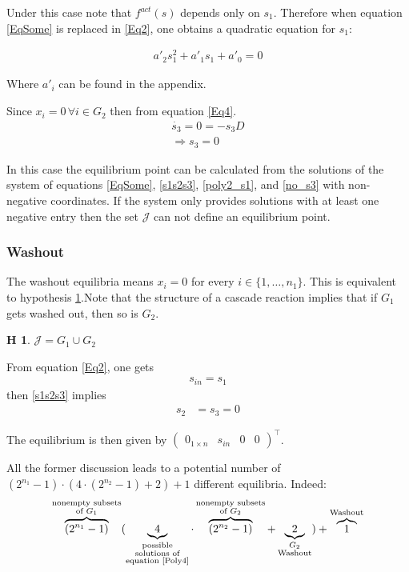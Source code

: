 \documentclass[processes,article,submit,moreauthors,pdftex]{Definitions/mdpi}
\newtheorem{hypo}{H}
\begin{document}
Under this case note that $f^{act}(s)$ depends only on $s_1$. Therefore when equation \eqref{EqSome} is replaced in \eqref{Eq2}, one obtains a quadratic equation for $s_1$:

\begin{align}
\label{poly2_s1} a'_2 s_1^2 + a'_1s_1 + a'_0 = 0
\end{align}

Where $a'_i$ can be found in the appendix.

Since $x_i = 0 \, \forall i \in G_2$ then from equation \eqref{Eq4}.
\begin{align}
\dot{s_3} = 0 = -s_3D \\
\Rightarrow s_3 = 0 \label{no_s3}
\end{align}

In this case the equilibrium point can be calculated from the solutions of the system of equations \eqref{EqSome}, \eqref{s1s2s3}, \eqref{poly2_s1}, and \eqref{no_s3} with non-negative coordinates. If the system only provides solutions with at least one negative entry then the set $\mathcal{J}$ can not define an equilibrium point.

\subsubsection{Washout}

The washout equilibria means $x_i = 0$ for every $i \in \{1,\dots, n_1\}$. This is equivalent to hypothesis \ref{hypothesis washout}.Note that the structure of a cascade reaction implies that if $G_1$ gets washed out, then so is $G_2$.

\begin{hypo} 
	$\mathcal{J} = G_1 \cup G_2$
	\label{hypothesis washout}
\end{hypo} 

From equation \eqref{Eq2}, one gets 
\begin{align*} s_{in} = s_1 \end{align*}
then \eqref{s1s2s3} implies 
\begin{align*}s_2 &= s_3 = 0 \end{align*}   

The equilibrium is then given by $\begin{pmatrix} 0_{1\times n}& s_{in}&0 &0 \end{pmatrix}^\top$.

All the former discussion leads to a potential number of   $ (2^{n_1}-1)\cdot (4\cdot(2^{n_2}-1)+2)+1 $  different equilibria. Indeed: 
\begin{align} \overbrace{(2^{n_1}-1)}^{\substack{\text{nonempty subsets} \\ \text{of }G_1 }} (\underbrace{4}_{\substack{\text{possible} \\ \text{solutions of} \\ \text{equation \eqref{Poly4}}}} \cdot\overbrace{(2^{n_2}-1)}^{\substack{\text{nonempty subsets} \\ \text{of  }G_2}}+\underbrace{2}_{\substack{G_2 \\ \text{Washout}}})+\overbrace{1}^\text{Washout} 
\end{align}
\end{document}
